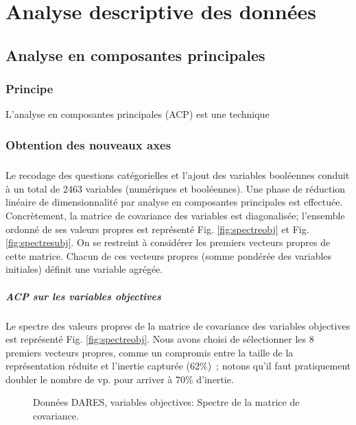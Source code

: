 \documentclass[11pt,fleqn,a4paper,openany,frenchb]{book} %
\begin{document}
\chapter{Analyse descriptive des données}
\section{Analyse en composantes principales}
\subsection{Principe}
L'analyse en composantes principales (ACP) est une technique
\subsection{Obtention des nouveaux axes }
\paragraph{}
Le recodage des questions catégorielles et l'ajout des variables booléennes conduit à un total de 2463 variables (numériques et booléennes). Une phase de réduction linéaire de dimensionnalité par analyse en composantes principales est effectuée. Concrètement, la matrice de covariance des variables est diagonalisée; l'ensemble ordonné de ses valeurs propres est représenté Fig. \ref{fig:spectreobj} et Fig. \ref{fig:spectresubj}. On se restreint à considérer les premiers vecteurs propres de cette matrice. Chacun de ces vecteurs propres (somme pondérée des variables initiales) définit une variable agrégée. 

\paragraph{ACP sur les variables objectives\\}
Le spectre des valeurs propres de la matrice de covariance des variables objectives est représenté Fig. \ref{fig:spectreobj}.  Nous avons choisi de sélectionner les 8 premiers vecteurs propres, comme un compromis entre la taille de la représentation réduite et l'inertie capturée (62\%)~; notons qu'il faut pratiquement doubler le nombre de vp. pour arriver à 70\% d'inertie. 

\begin{figure}[!h]
    \centering
  \hspace{2pt}
  \caption{Données DARES, variables objectives: Spectre de la matrice de covariance.}
\end{figure}
  
\end{document}
